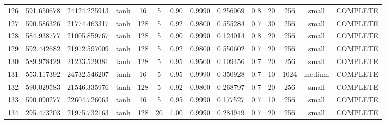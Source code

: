 \begin{longtable}{cccccccccccccc}
                      126 &                 591.650678 &                       24124.225913 &            tanh &          16 &              5 &        0.90 & 0.9990 &       0.256069 &             0.8 &                 20 &      256 &     small & COMPLETE \\
                      127 &                 590.586326 &                       21774.463317 &            tanh &         128 &              5 &        0.92 & 0.9800 &       0.555284 &             0.7 &                 30 &      256 &     small & COMPLETE \\
                      128 &                 584.938777 &                       21005.859767 &            tanh &         128 &              5 &        0.90 & 0.9990 &       0.124014 &             0.8 &                 20 &      256 &     small & COMPLETE \\
                      129 &                 592.442682 &                       21912.597009 &            tanh &         128 &              5 &        0.92 & 0.9800 &       0.550602 &             0.7 &                 20 &      256 &     small & COMPLETE \\
                      130 &                 589.978429 &                       21233.529381 &            tanh &         128 &              5 &        0.95 & 0.9500 &       0.109456 &             0.7 &                 20 &      256 &     small & COMPLETE \\
                      131 &                 553.117392 &                       24732.546207 &            tanh &          16 &              5 &        0.95 & 0.9990 &       0.350928 &             0.7 &                 10 &     1024 &    medium & COMPLETE \\
                      132 &                 590.029583 &                       21546.335976 &            tanh &         128 &              5 &        0.92 & 0.9800 &       0.268797 &             0.7 &                 20 &      256 &     small & COMPLETE \\
                      133 &                 590.090277 &                       22604.726063 &            tanh &          16 &              5 &        0.95 & 0.9990 &       0.177527 &             0.7 &                 10 &      256 &     small & COMPLETE \\
                      134 &                 295.473203 &                       21975.732163 &            tanh &         128 &             20 &        1.00 & 0.9990 &       0.284949 &             0.7 &                 20 &      256 &     small & COMPLETE \\

\end{longtable}
